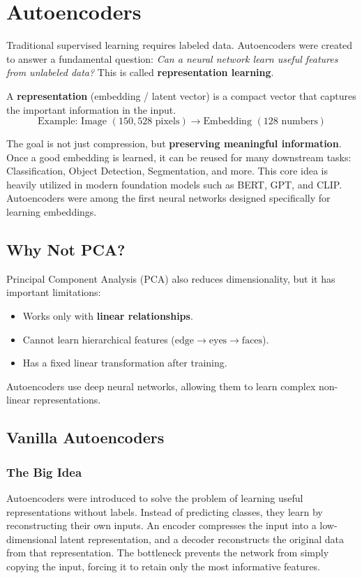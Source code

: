 \chapter{Autoencoders}

Traditional supervised learning requires labeled data. Autoencoders were created to answer a fundamental question: \emph{Can a neural network learn useful features from unlabeled data?} This is called \textbf{representation learning}.

A \textbf{representation} (embedding / latent vector) is a compact vector that captures the important information in the input. 
\[
\text{Example: Image } (150,528 \text{ pixels}) \longrightarrow \text{Embedding } (128 \text{ numbers})
\]

The goal is not just compression, but \textbf{preserving meaningful information}. Once a good embedding is learned, it can be reused for many downstream tasks: Classification, Object Detection, Segmentation, and more. This core idea is heavily utilized in modern foundation models such as BERT, GPT, and CLIP. Autoencoders were among the first neural networks designed specifically for learning embeddings.

\section*{Why Not PCA?}
Principal Component Analysis (PCA) also reduces dimensionality, but it has important limitations:
\begin{itemize}
    \item Works only with \textbf{linear relationships}.
    \item Cannot learn hierarchical features ($\text{edge} \rightarrow \text{eyes} \rightarrow \text{faces}$).
    \item Has a fixed linear transformation after training.
\end{itemize}
Autoencoders use deep neural networks, allowing them to learn complex non-linear representations.

\section{Vanilla Autoencoders}

\subsection{The Big Idea}
Autoencoders were introduced to solve the problem of learning useful representations without labels. Instead of predicting classes, they learn by reconstructing their own inputs. An encoder compresses the input into a low-dimensional latent representation, and a decoder reconstructs the original data from that representation. The bottleneck prevents the network from simply copying the input, forcing it to retain only the most informative features.

